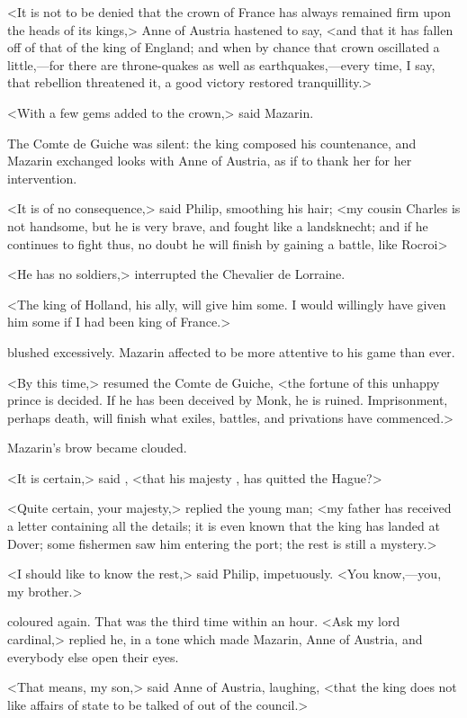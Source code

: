 <It is not to be denied that the crown of France has always remained firm upon the heads of its kings,> Anne of Austria hastened to say, <and that it has fallen off of that of the king of England; and when by chance that crown oscillated a little,—for there are throne-quakes as well as earthquakes,—every time, I say, that rebellion threatened it, a good victory restored tranquillity.>

<With a few gems added to the crown,> said Mazarin.

The Comte de Guiche was silent: the king composed his countenance, and Mazarin exchanged looks with Anne of Austria, as if to thank her for her intervention.

<It is of no consequence,> said Philip, smoothing his hair; <my cousin Charles is not handsome, but he is very brave, and fought like a landsknecht; and if he continues to fight thus, no doubt he will finish by gaining a battle, like Rocroi\longdash>

<He has no soldiers,> interrupted the Chevalier de Lorraine.

<The king of Holland, his ally, will give him some. I would willingly have given him some if I had been king of France.>

 blushed excessively. Mazarin affected to be more attentive to his game than ever.

<By this time,> resumed the Comte de Guiche, <the fortune of this unhappy prince is decided. If he has been deceived by Monk, he is ruined. Imprisonment, perhaps death, will finish what exiles, battles, and privations have commenced.>

Mazarin's brow became clouded.

<It is certain,> said , <that his majesty , has quitted the Hague?>

<Quite certain, your majesty,> replied the young man; <my father has received a letter containing all the details; it is even known that the king has landed at Dover; some fishermen saw him entering the port; the rest is still a mystery.>

<I should like to know the rest,> said Philip, impetuously. <You know,—you, my brother.>

 coloured again. That was the third time within an hour. <Ask my lord cardinal,> replied he, in a tone which made Mazarin, Anne of Austria, and everybody else open their eyes.

<That means, my son,> said Anne of Austria, laughing, <that the king does not like affairs of state to be talked of out of the council.>

